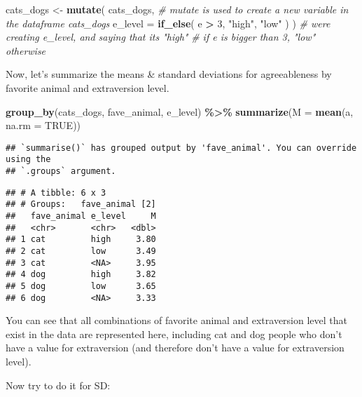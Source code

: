 \documentclass[
]{article}
\newenvironment{Shaded}{\begin{snugshade}}{\end{snugshade}}
\newcommand{\AttributeTok}[1]{\textcolor[rgb]{0.13,0.29,0.53}{#1}}
\newcommand{\CommentTok}[1]{\textcolor[rgb]{0.56,0.35,0.01}{\textit{#1}}}
\newcommand{\ConstantTok}[1]{\textcolor[rgb]{0.56,0.35,0.01}{#1}}
\newcommand{\DecValTok}[1]{\textcolor[rgb]{0.00,0.00,0.81}{#1}}
\newcommand{\FunctionTok}[1]{\textcolor[rgb]{0.13,0.29,0.53}{\textbf{#1}}}
\newcommand{\NormalTok}[1]{#1}
\newcommand{\OtherTok}[1]{\textcolor[rgb]{0.56,0.35,0.01}{#1}}
\newcommand{\SpecialCharTok}[1]{\textcolor[rgb]{0.81,0.36,0.00}{\textbf{#1}}}
\newcommand{\StringTok}[1]{\textcolor[rgb]{0.31,0.60,0.02}{#1}}
\begin{document}
\begin{Shaded}
\begin{Highlighting}[]
\NormalTok{cats\_dogs }\OtherTok{\textless{}{-}} \FunctionTok{mutate}\NormalTok{(}
\NormalTok{  cats\_dogs, }\CommentTok{\# mutate is used to create a new variable in the dataframe cats\_dogs}
  \AttributeTok{e\_level =} \FunctionTok{if\_else}\NormalTok{(}
\NormalTok{    e }\SpecialCharTok{\textgreater{}} \DecValTok{3}\NormalTok{, }\StringTok{"high"}\NormalTok{, }\StringTok{"low"}
\NormalTok{    )}
\NormalTok{  ) }\CommentTok{\# we\textquotesingle{}re creating e\_level, and saying that it\textquotesingle{}s "high" }
    \CommentTok{\# if e is bigger than 3, "low" otherwise}
\end{Highlighting}
\end{Shaded}

Now, let's summarize the means \& standard deviations for agreeableness
by favorite animal and extraversion level.

\begin{Shaded}
\begin{Highlighting}[]
\FunctionTok{group\_by}\NormalTok{(cats\_dogs, fave\_animal, e\_level) }\SpecialCharTok{\%\textgreater{}\%} 
  \FunctionTok{summarize}\NormalTok{(}\AttributeTok{M =} \FunctionTok{mean}\NormalTok{(a, }\AttributeTok{na.rm =} \ConstantTok{TRUE}\NormalTok{))}
\end{Highlighting}
\end{Shaded}

\begin{verbatim}
## `summarise()` has grouped output by 'fave_animal'. You can override using the
## `.groups` argument.
\end{verbatim}

\begin{verbatim}
## # A tibble: 6 x 3
## # Groups:   fave_animal [2]
##   fave_animal e_level     M
##   <chr>       <chr>   <dbl>
## 1 cat         high     3.80
## 2 cat         low      3.49
## 3 cat         <NA>     3.95
## 4 dog         high     3.82
## 5 dog         low      3.65
## 6 dog         <NA>     3.33
\end{verbatim}

You can see that all combinations of favorite animal and extraversion
level that exist in the data are represented here, including cat and dog
people who don't have a value for extraversion (and therefore don't have
a value for extraversion level).

Now try to do it for SD:
\end{document}
